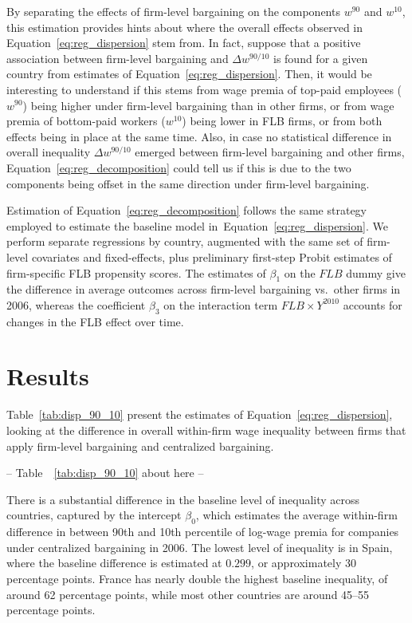 \documentclass[Review,times,sageh,11pt]{sagej}
\begin{document}
By separating the effects of firm-level bargaining on the components $w^{90}$ and $w^{10}$, this estimation provides hints about where the overall effects observed in Equation~\eqref{eq:reg_dispersion} stem from. In fact, suppose that a positive association between firm-level bargaining and $\Delta w^{90/10}$ is found for a given country from estimates of Equation~\eqref{eq:reg_dispersion}. Then, it would be interesting to understand if this stems from wage premia of top-paid employees ($w^{90}$) being higher under firm-level bargaining than in other firms, or from wage premia of bottom-paid workers ($w^{10}$) being lower in FLB firms, or from both effects being in place at the same time. Also, in case no statistical difference in overall inequality $\Delta w^{90/10}$ emerged between firm-level bargaining and other firms, Equation~\eqref{eq:reg_decomposition} could tell us if this is due to the two components being offset in the same direction under firm-level bargaining. 

Estimation of Equation~\eqref{eq:reg_decomposition} follows the same strategy employed to estimate the baseline model in~Equation~\eqref{eq:reg_dispersion}. We perform separate regressions by country, augmented with the same set of firm-level covariates and fixed-effects, plus preliminary first-step Probit estimates of firm-specific FLB propensity scores. The estimates of $\beta_1$ on the $\mathit{FLB}$ dummy give the difference in average outcomes across firm-level bargaining vs.~other firms in 2006, whereas the coefficient $\beta_3$ on the interaction term $\mathit{FLB} \times Y^{2010}$ accounts for changes in the FLB effect over time.


\section*{Results}
\label{sec:results}
Table~\ref{tab:disp_90_10} present the estimates of Equation~\eqref{eq:reg_dispersion}, looking at the difference in overall within-firm wage inequality between firms that apply firm-level bargaining and centralized bargaining.

\begin{center}
-- Table~~\ref{tab:disp_90_10} about here --
\end{center}

There is a substantial difference in the baseline level of inequality across countries, captured by the intercept $\beta_0$, which estimates the average within-firm difference in between 90th and 10th percentile of log-wage premia for companies under centralized bargaining in 2006. The lowest level of inequality is in Spain, where the baseline difference is estimated at $0.299$, or approximately 30 percentage points. France has nearly double the highest baseline inequality, of around 62 percentage points, while most other countries are around 45--55 percentage points.
\end{document}
